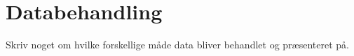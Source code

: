 \chapter{Databehandling}
\label{TestAfSkalaDatabehandling}
%
Skriv noget om hvilke forskellige måde data bliver behandlet og præsenteret på. 